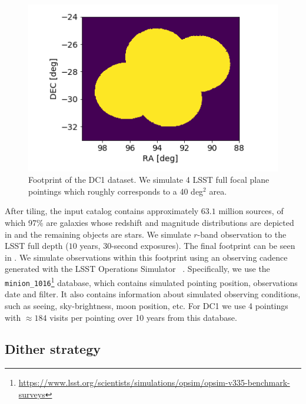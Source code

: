 \documentclass[\docopts]{\docclass}
\begin{document}
\begin{figure}
\centering
\includegraphics[width=0.9\columnwidth]{footprint.png}
\caption{Footprint of the DC1 dataset. We simulate 4 LSST full focal plane pointings which roughly corresponds to a 40 deg$^{2}$ area.}
\label{fig:footprint}
\end{figure}

After tiling, the input catalog contains approximately $63.1$ million sources, of which 97\% are galaxies whose redshift and magnitude distributions are depicted in  and the remaining objects are stars. We simulate $r$-band observation to the LSST full depth ($10$ years, 30-second exposures). The final footprint can be seen in . We simulate observations within this footprint using an observing cadence generated with the LSST Operations Simulator~ \citep[OpSim]{2014SPIE.9150E..15D}. Specifically, we use the \texttt{minion\_1016}\footnote{\url{https://www.lsst.org/scientists/simulations/opsim/opsim-v335-benchmark-surveys}} database, which contains simulated pointing position, observations date and filter. It also contains information about simulated observing conditions, such as seeing, sky-brightness, moon position, etc. For DC1 we use 4 pointings with $\approx 184$ visits per pointing over 10 years from this database.

\subsection{Dither strategy}
\label{sec:dithering}
\end{document}
